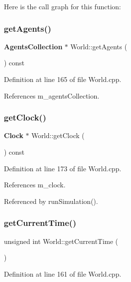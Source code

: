 Here is the call graph for this function\+:
\mbox{\label{class_world_a365cced3803fd8390a781619b61e2818}} 
\subsubsection{get\+Agents()}
{\footnotesize\ttfamily \textbf{ Agents\+Collection} $\ast$ World\+::get\+Agents (\begin{DoxyParamCaption}{ }\end{DoxyParamCaption}) const}



Definition at line 165 of file World.\+cpp.



References m\+\_\+agents\+Collection.

\mbox{\label{class_world_a521915088db371c5730093331a74b080}} 
\subsubsection{get\+Clock()}
{\footnotesize\ttfamily \textbf{ Clock} $\ast$ World\+::get\+Clock (\begin{DoxyParamCaption}{ }\end{DoxyParamCaption}) const}



Definition at line 173 of file World.\+cpp.



References m\+\_\+clock.



Referenced by run\+Simulation().

\mbox{\label{class_world_af33b51dff9edc6770890ef579700d959}} 
\subsubsection{get\+Current\+Time()}
{\footnotesize\ttfamily unsigned int World\+::get\+Current\+Time (\begin{DoxyParamCaption}{ }\end{DoxyParamCaption})}



Definition at line 161 of file World.\+cpp.



